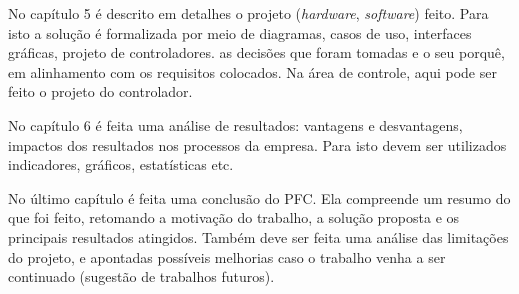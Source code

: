 No capítulo 5 é descrito em detalhes o projeto (\emph{hardware}, \emph{software}) feito. Para isto a solução é formalizada por meio de diagramas, casos de uso, interfaces gráficas, projeto de controladores. as decisões que foram tomadas e o seu porquê, em alinhamento com os requisitos colocados. Na área de controle, aqui pode ser feito o projeto do controlador.

No capítulo 6 é feita uma análise de resultados: vantagens e desvantagens, impactos dos resultados nos processos da empresa. Para isto devem ser utilizados indicadores, gráficos, estatísticas etc.

No último capítulo é feita uma conclusão do PFC. Ela compreende um resumo do que foi feito, retomando a motivação do trabalho, a solução proposta e os principais resultados atingidos. Também deve ser feita uma análise das limitações do projeto, e apontadas possíveis melhorias caso o trabalho venha a ser continuado (sugestão de trabalhos futuros).